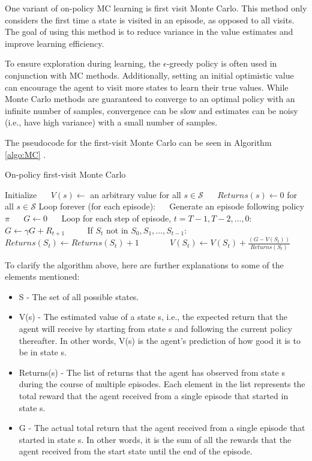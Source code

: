 One variant of on-policy MC learning is first visit Monte Carlo. This method only considers the first time a state is visited in an episode, as opposed to all visits. The goal of using this method is to reduce variance in the value estimates and improve learning efficiency.

To ensure exploration during learning, the $\epsilon$-greedy policy is often used in conjunction with MC methods. Additionally, setting an initial optimistic value can encourage the agent to visit more states to learn their true values. While Monte Carlo methods are guaranteed to converge to an optimal policy with an infinite number of samples, convergence can be slow and estimates can be noisy (i.e., have high variance) with a small number of samples.

The pseudocode for the first-visit Monte Carlo can be seen in Algorithm \ref{algo:MC} \citep{RLSuttonBarto}.

\begin{algorithm}
\caption{On-policy first-visit Monte Carlo}\label{algo:MC}
\begin{algorithmic}[1]
\State Initialize
\State $\quad$ $V(s) \gets$ an arbitrary value for all $s \in \mathcal{S}$
\State $\quad$ $Returns(s) \gets 0$ for all $s \in \mathcal{S}$
\State Loop forever (for each episode):
\State $\quad$ Generate an episode following policy $\pi$
\State $\quad$ $G \gets 0$
\State $\quad$ Loop for each step of episode, $t=T-1,T-2,\ldots,0$:
\State $\qquad$ $G \gets \gamma G + R_{t+1}$
\State $\qquad$ If $S_t$ not in $S_0,S_1,\ldots,S_{t-1}$:
\State $\qquad\quad$ $Returns(S_t) \gets Returns(S_t) + 1$
\State $\qquad\quad$ $V(S_t) \gets V(S_t) + \frac{(G-V(S_t))}{Returns(S_t)}$
\end{algorithmic}
\end{algorithm}

To clarify the algorithm above, here are further explanations to some of the elements mentioned:
\begin{itemize}
\item S - The set of all possible states.
\item V(s) - The estimated value of a state s, i.e., the expected return that the agent will receive by starting from state s and following the current policy thereafter. In other words, V(s) is the agent's prediction of how good it is to be in state s.
\item Returns(s) - The list of returns that the agent has observed from state s during the course of multiple episodes. Each element in the list represents the total reward that the agent received from a single episode that started in state s.
\item G - The actual total return that the agent received from a single episode that started in state s. In other words, it is the sum of all the rewards that the agent received from the start state until the end of the episode.
\end{itemize}

